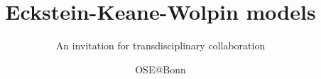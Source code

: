 
\title{\huge\textbf{Eckstein-Keane-Wolpin models}}
\subtitle{An invitation for transdisciplinary collaboration}
\author{OSE@Bonn}
\date{}
